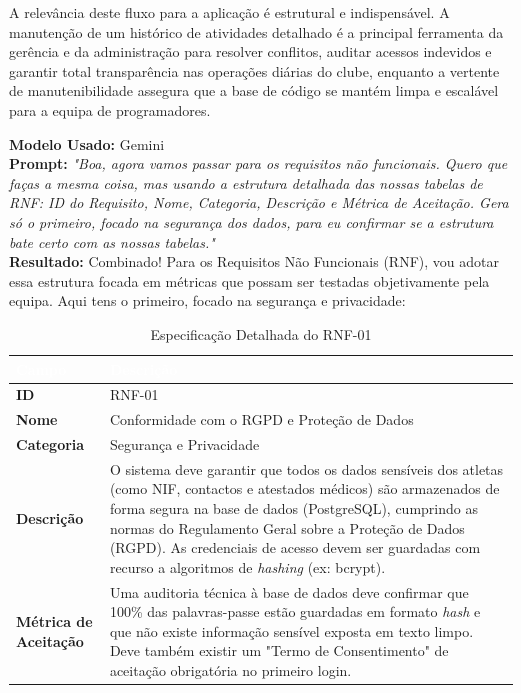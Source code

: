 \documentclass[a4paper,12pt]{scrreprt}
\newcommand{\caixaprompt}[3]{
    \begin{tcolorbox}[
        enhanced,
        colback=azulclaro,      %
        colframe=blue!50!black, %
        arc=2mm,                %
        boxrule=0.5mm,          %
        title=\textbf{Documentação de IA}, %
        fonttitle=\sffamily,
        coltitle=black,
        attach title to upper,
        after title={\par\medskip},
    ]
        \textbf{Modelo Usado:} #1 \\
        \textbf{Prompt:} \textit{"#2"} \\
        \tcbline %
        \textbf{Resultado:} #3
    \end{tcolorbox}
}
\begin{document}
{A relevância deste fluxo para a aplicação é estrutural e indispensável. A manutenção de um histórico de atividades detalhado é a principal ferramenta da gerência e da administração para resolver conflitos, auditar acessos indevidos e garantir total transparência nas operações diárias do clube, enquanto a vertente de manutenibilidade assegura que a base de código se mantém limpa e escalável para a equipa de programadores.

\caixaprompt{Gemini}{Boa, agora vamos passar para os requisitos não funcionais. Quero que faças a mesma coisa, mas usando a estrutura detalhada das nossas tabelas de RNF: ID do Requisito, Nome, Categoria, Descrição e Métrica de Aceitação. Gera só o primeiro, focado na segurança dos dados, para eu confirmar se a estrutura bate certo com as nossas tabelas.}{Combinado! Para os Requisitos Não Funcionais (RNF), vou adotar essa estrutura focada em métricas que possam ser testadas objetivamente pela equipa. Aqui tens o primeiro, focado na segurança e privacidade:

\rowcolors{2}{rowblue}{white}
\begin{table}[H]
\centering
\begin{tabularx}{\textwidth}{|l|X|}
\hline
\rowcolor{headerblue}\textcolor{white}{\textbf{Campo}} & \textcolor{white}{\textbf{Descrição}} \\ \hline
\textbf{ID} & RNF-01 \\ \hline
\textbf{Nome} & Conformidade com o RGPD e Proteção de Dados \\ \hline
\textbf{Categoria} & Segurança e Privacidade \\ \hline
\textbf{Descrição} & O sistema deve garantir que todos os dados sensíveis dos atletas (como NIF, contactos e atestados médicos) são armazenados de forma segura na base de dados (PostgreSQL), cumprindo as normas do Regulamento Geral sobre a Proteção de Dados (RGPD). As credenciais de acesso devem ser guardadas com recurso a algoritmos de \textit{hashing} (ex: bcrypt). \\ \hline
\textbf{Métrica de Aceitação} & Uma auditoria técnica à base de dados deve confirmar que 100\% das palavras-passe estão guardadas em formato \textit{hash} e que não existe informação sensível exposta em texto limpo. Deve também existir um "Termo de Consentimento" de aceitação obrigatória no primeiro login. \\ \hline
\end{tabularx}
\caption{Especificação Detalhada do RNF-01}
\end{table}
\rowcolors{2}{white}{white}

}}
\end{document}
